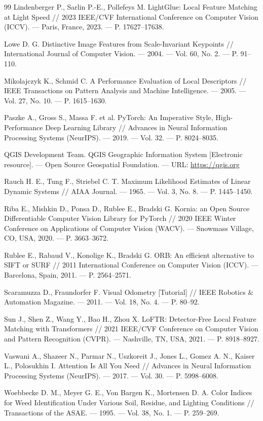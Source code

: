 \documentclass[a4paper, 12pt, titlepage]{article}
\begin{document}
\begin{thebibliography}{99}
Lindenberger P., Sarlin P.-E., Pollefeys M. LightGlue: Local Feature Matching at Light Speed // 2023 IEEE/CVF International Conference on Computer Vision (ICCV). --- Paris, France, 2023. --- P. 17627--17638.

Lowe D. G. Distinctive Image Features from Scale-Invariant Keypoints // International Journal of Computer Vision. --- 2004. --- Vol. 60, No. 2. --- P. 91--110.

Mikolajczyk K., Schmid C. A Performance Evaluation of Local Descriptors // IEEE Transactions on Pattern Analysis and Machine Intelligence. --- 2005. --- Vol. 27, No. 10. --- P. 1615--1630.

Paszke A., Gross S., Massa F. et al. PyTorch: An Imperative Style, High-Performance Deep Learning Library // Advances in Neural Information Processing Systems (NeurIPS). --- 2019. --- Vol. 32. --- P. 8024--8035.

QGIS Development Team. QGIS Geographic Information System [Electronic resource]. --- Open Source Geospatial Foundation. --- URL: \url{https://qgis.org}

Rauch H. E., Tung F., Striebel C. T. Maximum Likelihood Estimates of Linear Dynamic Systems // AIAA Journal. --- 1965. --- Vol. 3, No. 8. --- P. 1445--1450.

Riba E., Mishkin D., Ponsa D., Rublee E., Bradski G. Kornia: an Open Source Differentiable Computer Vision Library for PyTorch // 2020 IEEE Winter Conference on Applications of Computer Vision (WACV). --- Snowmass Village, CO, USA, 2020. --- P. 3663--3672.

Rublee E., Rabaud V., Konolige K., Bradski G. ORB: An efficient alternative to SIFT or SURF // 2011 International Conference on Computer Vision (ICCV). --- Barcelona, Spain, 2011. --- P. 2564--2571.

Scaramuzza D., Fraundorfer F. Visual Odometry [Tutorial] // IEEE Robotics \& Automation Magazine. --- 2011. --- Vol. 18, No. 4. --- P. 80--92.

Sun J., Shen Z., Wang Y., Bao H., Zhou X. LoFTR: Detector-Free Local Feature Matching with Transformers // 2021 IEEE/CVF Conference on Computer Vision and Pattern Recognition (CVPR). --- Nashville, TN, USA, 2021. --- P. 8918--8927.

Vaswani A., Shazeer N., Parmar N., Uszkoreit J., Jones L., Gomez A. N., Kaiser L., Polosukhin I. Attention Is All You Need // Advances in Neural Information Processing Systems (NeurIPS). --- 2017. --- Vol. 30. --- P. 5998--6008.

Woebbecke D. M., Meyer G. E., Von Bargen K., Mortensen D. A. Color Indices for Weed Identification Under Various Soil, Residue, and Lighting Conditions // Transactions of the ASAE. --- 1995. --- Vol. 38, No. 1. --- P. 259--269.

\end{thebibliography}
\end{document}
